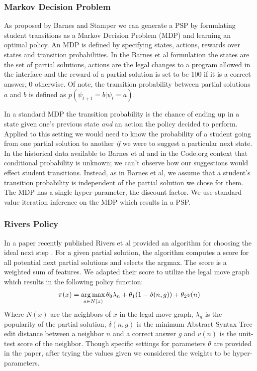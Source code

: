\subsubsection{Markov Decision Problem}
As proposed by Barnes and Stamper we can generate a PSP by formulating student transitions as a Markov Decision Problem (MDP) and learning an optimal policy. An MDP is defined by specifying states, actions, rewards over states and transition probabilities. In the Barnes et al formulation the states are the set of partial solutions, actions are the legal changes to a program allowed in the interface and the reward of a partial solution is set to be 100 if it is a correct answer, 0 otherwise. Of note, the transition probability between partial solutions $a$ and $b$ is defined as $p(\psi_{t+1} = b | \psi_t = a)$.

In a standard MDP the transition probability is the chance of ending up in a state given one's previous state \emph{and} an action the policy decided to perform. Applied to this setting we would need to know the probability of a student going from one partial solution to another \emph{if} we were to suggest a particular next state. In the historical data available to Barnes et al and in the Code.org context that conditional probability is unknown; we can't observe how our suggestions would effect student transitions. Instead, as in Barnes et al, we assume that a student's transition probability is independent of the partial solution we chose for them. The MDP has a single hyper-parameter, the discount factor. We use standard value iteration \cite{shapley1953stochastic} inference on the MDP which results in a PSP. 

\subsubsection{Rivers Policy}
In a paper recently published Rivers et al provided an algorithm for choosing the ideal next step \cite{rivers2014automating}. For a given partial solution, the algorithm computes a score for all potential next partial solutions and selects the argmax. The score is a weighted sum of features. We adapted their score to utilize the legal move graph which results in the following policy function:
\begin{align*}
\pi(x) = \operatorname*{arg\,max}_{n \in N(x)} {\theta_0 \lambda_n + \theta_1 (1 - \delta(n, g)) + \theta_2 v(n)}
\end{align*}
Where $N(x)$ are the neighbors of $x$ in the legal move graph, $\lambda_n$ is the popularity of the partial solution, $\delta(n, g)$ is the minimum Abstract Syntax Tree edit distance between a neighbor $n$ and a correct answer $g$ and $v(n)$ is the unit-test score of the neighbor. Though specific settings for parameters $\theta$ are provided in the paper, after trying the values given we considered the weights to be hyper-parameters. 




